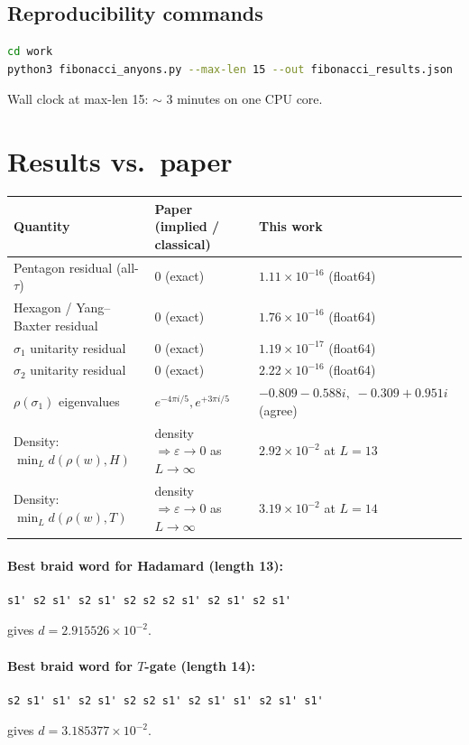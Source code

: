 \documentclass[11pt]{article}
\begin{document}
\subsection{Reproducibility commands}
\begin{lstlisting}[language=bash]
cd work
python3 fibonacci_anyons.py --max-len 15 --out fibonacci_results.json
\end{lstlisting}
Wall clock at max-len 15: $\sim$ 3 minutes on one CPU core.

\section{Results vs.\ paper}

\begin{center}
\begin{tabular}{@{}lll@{}}
\toprule
\textbf{Quantity} & \textbf{Paper (implied / classical)} & \textbf{This work} \\
\midrule
Pentagon residual (all-$\tau$) & 0 (exact) & $1.11\times 10^{-16}$ (float64) \\
Hexagon / Yang--Baxter residual & 0 (exact) & $1.76\times 10^{-16}$ (float64) \\
$\sigma_1$ unitarity residual & 0 (exact) & $1.19\times 10^{-17}$ (float64) \\
$\sigma_2$ unitarity residual & 0 (exact) & $2.22\times 10^{-16}$ (float64) \\
$\rho(\sigma_1)$ eigenvalues & $e^{-4\pi i/5}, e^{+3\pi i/5}$ & $-0.809 - 0.588i,\; -0.309 + 0.951i$ (agree) \\
Density: $\min_L d(\rho(w), H)$ & density $\Rightarrow \varepsilon \to 0$ as $L\to\infty$ & $2.92\times 10^{-2}$ at $L=13$ \\
Density: $\min_L d(\rho(w), T)$ & density $\Rightarrow \varepsilon \to 0$ as $L\to\infty$ & $3.19\times 10^{-2}$ at $L=14$ \\
\bottomrule
\end{tabular}
\end{center}

\paragraph{Best braid word for Hadamard (length 13):}
\begin{lstlisting}
s1' s2 s1' s2 s1' s2 s2 s2 s1' s2 s1' s2 s1'
\end{lstlisting}
gives $d = 2.915526 \times 10^{-2}$.

\paragraph{Best braid word for $T$-gate (length 14):}
\begin{lstlisting}
s2 s1' s1' s2 s1' s2 s2 s1' s2 s1' s1' s2 s1' s1'
\end{lstlisting}
gives $d = 3.185377 \times 10^{-2}$.
\end{document}
